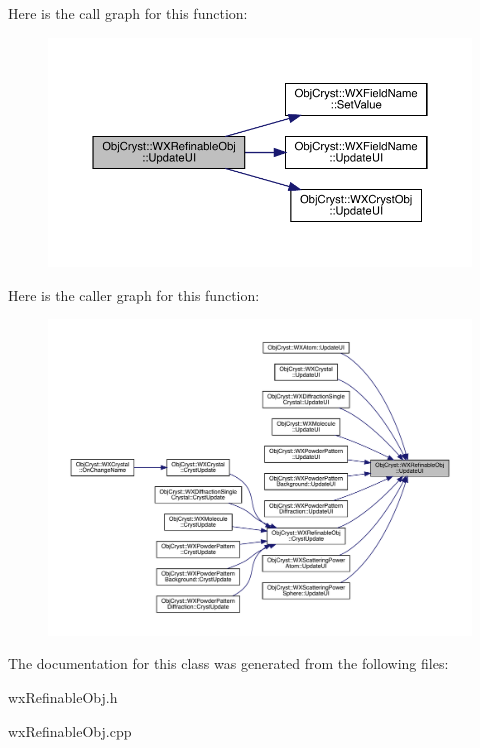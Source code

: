 Here is the call graph for this function\+:
\nopagebreak
\begin{figure}[H]
\begin{center}
\leavevmode
\includegraphics[width=350pt]{class_obj_cryst_1_1_w_x_refinable_obj_acbf70975a79661a73a1ae3c39c9c3045_cgraph}
\end{center}
\end{figure}
Here is the caller graph for this function\+:
\nopagebreak
\begin{figure}[H]
\begin{center}
\leavevmode
\includegraphics[width=350pt]{class_obj_cryst_1_1_w_x_refinable_obj_acbf70975a79661a73a1ae3c39c9c3045_icgraph}
\end{center}
\end{figure}


The documentation for this class was generated from the following files\+:\begin{DoxyCompactItemize}
\item 
wx\+Refinable\+Obj.\+h\item 
wx\+Refinable\+Obj.\+cpp\end{DoxyCompactItemize}
